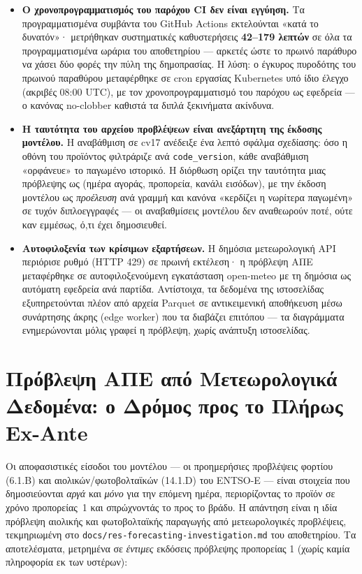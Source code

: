 \begin{itemize}
\item \textbf{Ο χρονοπρογραμματισμός του παρόχου CI δεν είναι εγγύηση.} Τα προγραμματισμένα συμβάντα του GitHub Actions εκτελούνται «κατά το δυνατόν»· μετρήθηκαν συστηματικές καθυστερήσεις \textbf{42--179 λεπτών} σε όλα τα προγραμματισμένα ωράρια του αποθετηρίου --- αρκετές ώστε το πρωινό παράθυρο να χάσει δύο φορές την πύλη της δημοπρασίας. Η λύση: ο έγκυρος πυροδότης του πρωινού παραθύρου μεταφέρθηκε σε cron εργασίας Kubernetes υπό ίδιο έλεγχο (ακριβές 08:00 UTC), με τον χρονοπρογραμματισμό του παρόχου ως εφεδρεία --- ο κανόνας no-clobber καθιστά τα διπλά ξεκινήματα ακίνδυνα.
\item \textbf{Η ταυτότητα του αρχείου προβλέψεων είναι ανεξάρτητη της έκδοσης μοντέλου.} Η αναβάθμιση σε cv17 ανέδειξε ένα λεπτό σφάλμα σχεδίασης: όσο η οθόνη του προϊόντος φιλτράριζε ανά \texttt{code\_version}, κάθε αναβάθμιση «ορφάνευε» το παγωμένο ιστορικό. Η διόρθωση ορίζει την ταυτότητα μιας πρόβλεψης ως (ημέρα αγοράς, προπορεία, κανάλι εισόδων), με την έκδοση μοντέλου ως \emph{προέλευση} ανά γραμμή και κανόνα «κερδίζει η νωρίτερα παγωμένη» σε τυχόν διπλοεγγραφές --- οι αναβαθμίσεις μοντέλου δεν αναθεωρούν ποτέ, ούτε καν εμμέσως, ό,τι έχει δημοσιευθεί.
\item \textbf{Αυτοφιλοξενία των κρίσιμων εξαρτήσεων.} Η δημόσια μετεωρολογική API περιόρισε ρυθμό (HTTP 429) σε πρωινή εκτέλεση· η πρόβλεψη ΑΠΕ μεταφέρθηκε σε αυτοφιλοξενούμενη εγκατάσταση open-meteo με τη δημόσια ως αυτόματη εφεδρεία ανά παρτίδα. Αντίστοιχα, τα δεδομένα της ιστοσελίδας εξυπηρετούνται πλέον από αρχεία Parquet σε αντικειμενική αποθήκευση μέσω συνάρτησης άκρης (edge worker) που τα διαβάζει επιτόπου --- τα διαγράμματα ενημερώνονται μόλις γραφεί η πρόβλεψη, χωρίς ανάπτυξη ιστοσελίδας.
\end{itemize}


\section{Πρόβλεψη ΑΠΕ από Μετεωρολογικά Δεδομένα: ο Δρόμος προς το Πλήρως Ex-Ante}
\label{sec:weather-res}

Οι αποφασιστικές είσοδοι του μοντέλου --- οι προημερήσιες προβλέψεις φορτίου (6.1.B) και αιολικών/φωτοβολταϊκών (14.1.D) του ENTSO-E --- είναι στοιχεία που δημοσιεύονται \emph{αργά} και \emph{μόνο} για την επόμενη ημέρα, περιορίζοντας το προϊόν σε χρόνο προπορείας~1 και σπρώχνοντάς το προς το βράδυ. Η απάντηση είναι η ιδία πρόβλεψη αιολικής και φωτοβολταϊκής παραγωγής από μετεωρολογικές προβλέψεις, τεκμηριωμένη στο \texttt{docs/res-forecasting-investigation.md} του αποθετηρίου. Τα αποτελέσματα, μετρημένα σε \emph{έντιμες} εκδόσεις πρόβλεψης προπορείας 1 (χωρίς καμία πληροφορία εκ των υστέρων):

